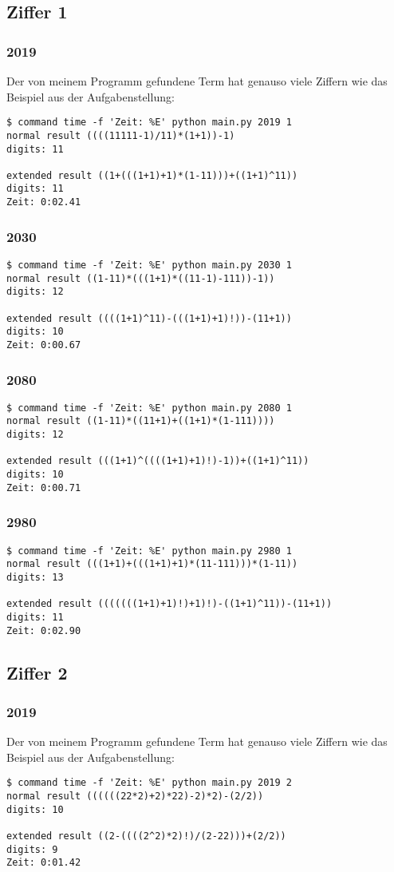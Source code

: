 \subsection{Ziffer 1}
\subsubsection{2019}
Der von meinem Programm gefundene Term hat genauso viele Ziffern wie das Beispiel aus der Aufgabenstellung:
\begin{lstlisting}
$ command time -f 'Zeit: %E' python main.py 2019 1
normal result ((((11111-1)/11)*(1+1))-1)
digits: 11

extended result ((1+(((1+1)+1)*(1-11)))+((1+1)^11))
digits: 11
Zeit: 0:02.41
\end{lstlisting}
\subsubsection{2030}
\begin{lstlisting}
$ command time -f 'Zeit: %E' python main.py 2030 1
normal result ((1-11)*(((1+1)*((11-1)-111))-1))
digits: 12

extended result ((((1+1)^11)-(((1+1)+1)!))-(11+1))
digits: 10
Zeit: 0:00.67
\end{lstlisting}
\subsubsection{2080}
\begin{lstlisting}
$ command time -f 'Zeit: %E' python main.py 2080 1
normal result ((1-11)*((11+1)+((1+1)*(1-111))))
digits: 12

extended result (((1+1)^((((1+1)+1)!)-1))+((1+1)^11))
digits: 10
Zeit: 0:00.71
\end{lstlisting}
\subsubsection{2980}
\begin{lstlisting}
$ command time -f 'Zeit: %E' python main.py 2980 1
normal result (((1+1)+(((1+1)+1)*(11-111)))*(1-11))
digits: 13

extended result (((((((1+1)+1)!)+1)!)-((1+1)^11))-(11+1))
digits: 11
Zeit: 0:02.90
\end{lstlisting}
\subsection{Ziffer 2}
\subsubsection{2019}
Der von meinem Programm gefundene Term hat genauso viele Ziffern wie das Beispiel aus der Aufgabenstellung:
\begin{lstlisting}
$ command time -f 'Zeit: %E' python main.py 2019 2
normal result ((((((22*2)+2)*22)-2)*2)-(2/2))
digits: 10

extended result ((2-((((2^2)*2)!)/(2-22)))+(2/2))
digits: 9
Zeit: 0:01.42
\end{lstlisting}
